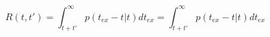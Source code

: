 \begin{equation}
R(t,t') = \int_{t+t'}^\infty p(t_{ex}-t|t) dt_{ex}  = \int_{t+t'}^\infty  p(t_{ex}-t|t) dt_{ex}
\end{equation}